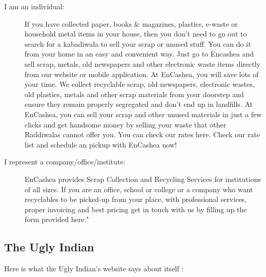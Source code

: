 \documentclass[10pt]{article}
\begin{document}
\begin{description}
\item[I am an individual:] If you have collected paper, books \& magazines, plastics, e-waste or household metal items in your house, then you don't need to go out to search for a kabadiwala to sell your scrap or unused stuff. You can do it from your home in an easy and convenient way. Just go to Encashea and sell scrap, metals, old newspapers and other electronic waste items directly from our website or mobile application.
At EnCashea, you will save lots of your time. We collect recyclable scrap, old newspapers, electronic wastes, old plastics, metals and other scrap materials from your doorstep and ensure they remain properly segregated and don't end up in landfills.
At EnCashea, you can sell your scrap and other unused materials in just a few clicks and get handsome money by selling your waste that other Raddiwalas cannot offer you. You can check our rates here.
Check our rate list and schedule an pickup with EnCashea now!
\item[I represent a company/office/institute:] EnCashea provides Scrap Collection and Recycling Services for institutions of all sizes. If you are an office, school or college or a company who want recyclables to be picked-up from your place, with professional services, proper invoicing and best pricing get in touch with us by filling up the form provided here."
\end{description}

\subsection{The Ugly Indian}

Here is what the Ugly Indian's website says about itself \citep{TheUglyIndian:about}:
\end{document}
